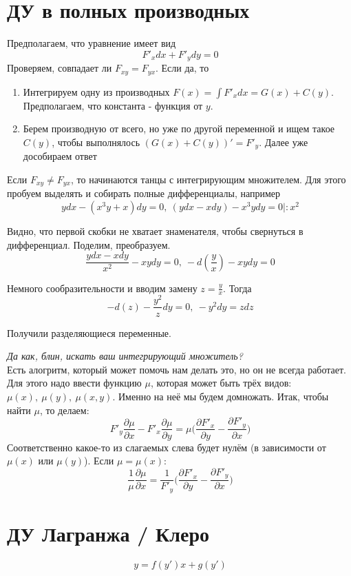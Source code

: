 \documentclass[11pt]{article}
\begin{document}
	\section{ДУ в полных производных}
	Предполагаем, что уравнение имеет вид
	$$F'_x dx + F'_y dy = 0$$
	Проверяем, совпадает ли $F_{xy} = F_{yx}$. Если да, то
	\begin{enumerate}
		\item Интегрируем одну из производных 
		$F(x) = \int F'_x dx = G(x) + C(y)$. Предполагаем, что константа - функция от $y$.
		\item Берем производную от всего, но уже по другой переменной и ищем такое $C(y)$, чтобы выполнялось $(G(x) + C(y))' = F'_y$. Далее уже дособираем ответ
	\end{enumerate}

	Если $F_{xy} \neq F_{yx}$, то начинаются танцы с интегрирующим множителем. Для этого пробуем выделять и собирать полные дифференциалы, например
	$$ydx - (x^3 y+x)dy = 0,\ (ydx - xdy) - x^3 ydy = 0 |: x^2$$
	
	Видно, что первой скобки не хватает знаменателя, чтобы свернуться в дифференциал. Поделим, преобразуем.
	$$\frac{ydx - xdy}{x^2} - xy dy = 0,\ -d(\frac{y}{x}) - xy dy = 0$$
	
	Немного сообразительности и вводим замену $z = \frac{y}{x}$. Тогда 
	$$-d(z) - \frac{y^2}{z} dy = 0,\ -y^2 dy = z dz$$
	
	Получили разделяющиеся переменные.

	\textit{Да как, блин, искать ваш интегрирующий множитель?} \\
	Есть алогритм, который может помочь нам делать это, но он не всегда работает. Для этого надо ввести функцию
	$\mu$, которая может быть трёх видов: $\mu(x), \ \mu(y), \ \mu(x, y)$. Именно на неё мы будем домножать. Итак, чтобы найти $\mu$, то делаем:
	$$F'_y \frac{\partial \mu}{\partial x} - F'_x \frac{\partial \mu}{\partial y} = \mu \bigg(\frac{\partial F'_x}{\partial y} - \frac{\partial F'_y}{\partial x}\bigg)$$
	Соответственно какое-то из слагаемых слева будет нулём (в зависимости от $\mu(x)$ или $\mu(y)$). Если $\mu = \mu(x)$:
	$$\frac{1}{\mu}\frac{\partial \mu}{\partial x} = \frac{1}{F'_y} \bigg(\frac{\partial F'_x}{\partial y} - \frac{\partial F'_y}{\partial x}\bigg)$$


	\section{ДУ Лагранжа / Клеро}
	$$y = f(y') x + g(y')$$
	
\end{document}
